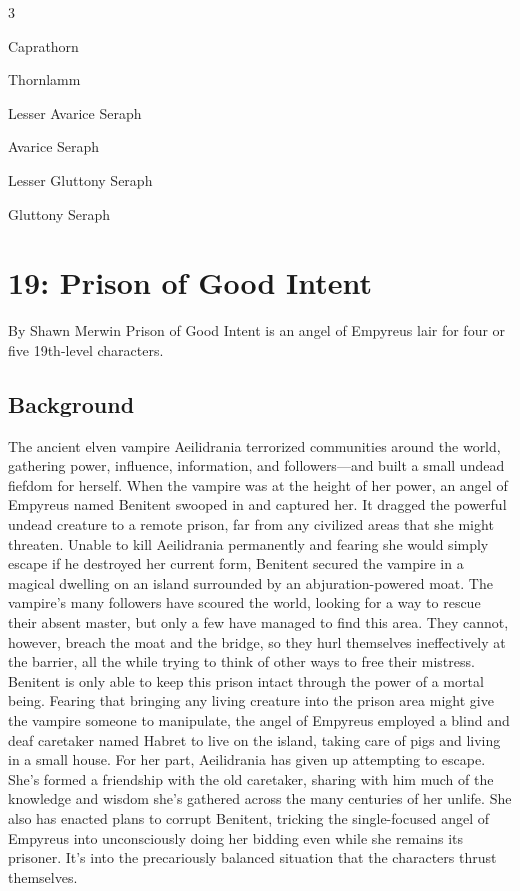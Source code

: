 \documentclass[10pt,a4paper,twoside,twocolumn,openany,bg=print,nodeprecatedcode]{dndbook}
\begin{document}
\begin{itemize}
\begin{multicols}{3}
\item Caprathorn
\item Thornlamm
\item Lesser Avarice Seraph
\item Avarice Seraph
\item Lesser Gluttony Seraph
\item Gluttony Seraph
\end{multicols}

\end{itemize}

\chapter{19: Prison of Good Intent}
By Shawn Merwin
Prison of Good Intent is an angel of Empyreus lair for four or five 19th-level characters.
\section{Background}
The ancient elven vampire Aeilidrania terrorized communities around the world, gathering power, influence, information, and followers—and built a small undead fiefdom for herself. When the vampire was at the height of her power, an angel of Empyreus named Benitent swooped in and captured her. It dragged the powerful undead creature to a remote prison, far from any civilized areas that she might threaten.
Unable to kill Aeilidrania permanently and fearing she would simply escape if he destroyed her current form, Benitent secured the vampire in a magical dwelling on an island surrounded by an abjuration-powered moat. The vampire's many followers have scoured the world, looking for a way to rescue their absent master, but only a few have managed to find this area. They cannot, however, breach the moat and the bridge, so they hurl themselves ineffectively at the barrier, all the while trying to think of other ways to free their mistress.
Benitent is only able to keep this prison intact through the power of a mortal being. Fearing that bringing any living creature into the prison area might give the vampire someone to manipulate, the angel of Empyreus employed a blind and deaf caretaker named Habret to live on the island, taking care of pigs and living in a small house.
For her part, Aeilidrania has given up attempting to escape. She's formed a friendship with the old caretaker, sharing with him much of the knowledge and wisdom she's gathered across the many centuries of her unlife. She also has enacted plans to corrupt Benitent, tricking the single-focused angel of Empyreus into unconsciously doing her bidding even while she remains its prisoner.
It's into the precariously balanced situation that the characters thrust themselves.
\end{document}
